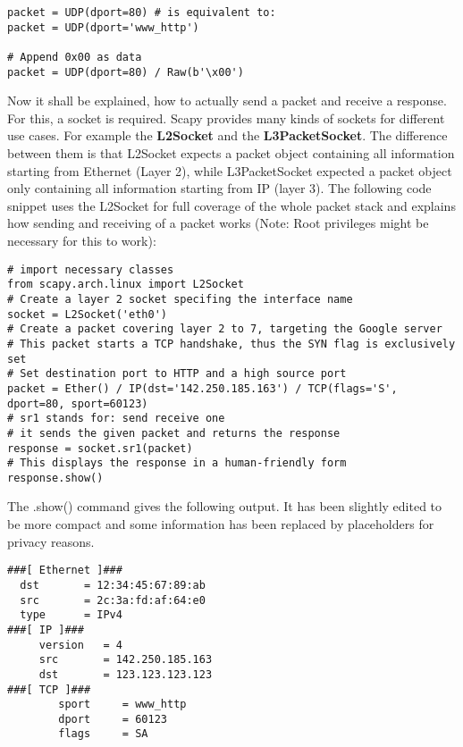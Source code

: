 \begin{samepage}
\begin{verbatim}
packet = UDP(dport=80) # is equivalent to:
packet = UDP(dport='www_http')

# Append 0x00 as data
packet = UDP(dport=80) / Raw(b'\x00')
\end{verbatim}
\end{samepage}

Now it shall be explained, how to actually send a packet and receive a response. For this, a socket is required. Scapy provides many kinds of sockets for different use cases. For example the \textbf{L2Socket} and the \textbf{L3PacketSocket}. The difference between them is that L2Socket expects a packet object containing all information starting from Ethernet (Layer 2), while L3PacketSocket expected a packet object only containing all information starting from IP (layer 3). The following code snippet uses the L2Socket for full coverage of the whole packet stack and explains how sending and receiving of a packet works (Note: Root privileges might be necessary for this to work):

\begin{samepage}
\begin{verbatim}
# import necessary classes
from scapy.arch.linux import L2Socket
# Create a layer 2 socket specifing the interface name
socket = L2Socket('eth0')
# Create a packet covering layer 2 to 7, targeting the Google server
# This packet starts a TCP handshake, thus the SYN flag is exclusively set
# Set destination port to HTTP and a high source port
packet = Ether() / IP(dst='142.250.185.163') / TCP(flags='S', dport=80, sport=60123)
# sr1 stands for: send receive one
# it sends the given packet and returns the response
response = socket.sr1(packet)
# This displays the response in a human-friendly form
response.show()
\end{verbatim}
\end{samepage}

The .show() command gives the following output. It has been slightly edited to be more compact and some information has been replaced by placeholders for privacy reasons.

\begin{samepage}
\begin{verbatim}
###[ Ethernet ]### 
  dst       = 12:34:45:67:89:ab
  src       = 2c:3a:fd:af:64:e0
  type      = IPv4
###[ IP ]### 
     version   = 4
     src       = 142.250.185.163
     dst       = 123.123.123.123
###[ TCP ]### 
        sport     = www_http
        dport     = 60123
        flags     = SA
\end{verbatim}
\end{samepage}

